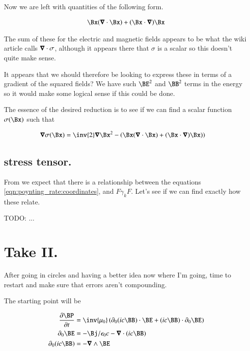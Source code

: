 Now we are left with quantities of the following form.

\begin{align*}
\Bx (\spacegrad \cdot \Bx) +(\Bx \cdot \spacegrad) \Bx 
\end{align*}

The sum of these for the electric and magnetic fields appears to be what the 
wiki article calls $\boldsymbol{\nabla} \cdot \sigma$, although it appears
there that $\sigma$ is a scalar so this doesn't quite make sense.

It appears that 
we should therefore be looking to
express these in terms of a gradient of the squared fields?  We have such $\BE^2$ and $\BB^2$ terms in the energy so it would make some logical sense if this
could be done.

The essence of the desired reduction is to see if we can find a scalar function $\sigma(\Bx)$ such that

\begin{align*}
\spacegrad \sigma(\Bx) &= \inv{2} \spacegrad \Bx^2 - \left(\Bx (\spacegrad \cdot \Bx) + (\Bx \cdot \spacegrad) \Bx )\right)
\end{align*}

\subsection{stress tensor. }

From \citep{doran2003gap} we expect that there is a relationship between
the equations \ref{eqn:poynting_rate:coordinates}, and $F \gamma_k F$.  Let's see 
if we can find exactly how these relate.



TODO: ...

\section{Take II. }

After going in circles and having a better idea now where I'm going, time to restart and make sure that errors aren't compounding.

The starting point will be

\begin{align*}
\PD{t}{\BP} &= \inv{\mu_0} \left( \partial_0 (i c\BB) \cdot \BE  + (i c\BB) \cdot \partial_0 \BE  \right) \\
\partial_0 \BE &= - \Bj/\epsilon_0 c - \spacegrad \cdot (ic \BB) \\
\partial_0 (i c \BB) &= -\spacegrad \wedge \BE
\end{align*}

